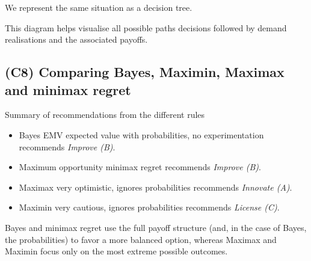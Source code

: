 	We represent the same situation as a decision tree.
	
	\begin{center}
	\end{center}
	
	This diagram helps visualise all possible paths decisions followed by demand realisations and the associated payoffs.
	
	\subsection{(C8) Comparing Bayes, Maximin, Maximax and minimax regret}\label{example-1-c8}
	
	Summary of recommendations from the different rules
	\begin{itemize}
		\item Bayes EMV expected value with probabilities, no experimentation recommends \emph{Improve (B)}.
		\item Maximum opportunity minimax regret recommends \emph{Improve (B)}.
		\item Maximax very optimistic, ignores probabilities recommends \emph{Innovate (A)}.
		\item Maximin very cautious, ignores probabilities recommends \emph{License (C)}.
	\end{itemize}
	
	Bayes and minimax regret use the full payoff structure (and, in the case of Bayes, the probabilities) to favor a more balanced option,
	whereas Maximax and Maximin focus only on the most extreme possible outcomes.
	
